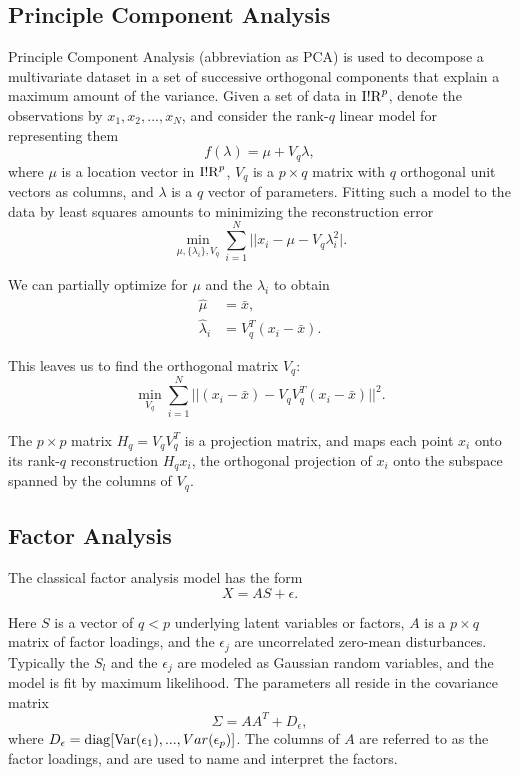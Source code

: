 \documentclass[10pt,journal,compsoc]{IEEEtran}
\begin{document}
\subsection{Principle Component Analysis}
\label{subsec:pca}

Principle Component Analysis (abbreviation as PCA) is used to decompose a multivariate dataset in a set of successive orthogonal components that explain a maximum amount of the variance. Given a set of data in ${\rm I!R}^p$, denote the observations by $x_1, x_2,...,x_N$, and consider the rank-$q$ linear model for representing them
\begin{equation}
  f(\lambda) = \mu + V_q\lambda,
\end{equation}
where $\mu$ is a location vector in ${\rm I!R}^p$, $V_q$ is a $p \times q$ matrix with $q$ orthogonal unit vectors as columns, and $\lambda$ is a $q$ vector of parameters. Fitting such a model to the data by least squares amounts to minimizing the reconstruction error
\begin{equation}
  \min_{\mu, \{\lambda_i\}, V_q} \sum_{i=1}^N||x_i - \mu - V_q\lambda_i^2|.
\end{equation}

We can partially optimize for $\mu$ and the $\lambda_i$ to obtain
\begin{align}
  \hat{\mu} &= \bar{x},\\
  \hat{\lambda}_i &= V_q^T(x_i - \bar{x}).
\end{align}

This leaves us to find the orthogonal matrix $V_q$:
\begin{equation}
  \min_{V_q}\sum_{i=1}^N||(x_i - \bar{x}) - V_qV_q^T(x_i - \bar{x})||^2.
\end{equation}

The $p\times p$ matrix $H_q = V_qV_q^T$ is a projection matrix, and maps each point $x_i$ onto its rank-$q$ reconstruction $H_qx_i$, the orthogonal projection of $x_i$ onto the subspace spanned by the columns of $V_q$.

\subsection{Factor Analysis}
\label{subsec:fa}
The classical factor analysis model has the form
\begin{equation}
  X = AS + \epsilon.
\end{equation}

Here $S$ is a vector of $q < p$ underlying latent variables or factors, $A$ is a $p \times q$ matrix of factor loadings, and the $\epsilon_j$ are uncorrelated zero-mean disturbances. Typically the $S_l$ and the $\epsilon_j$ are modeled as Gaussian random variables, and the model is fit by maximum likelihood. The parameters all reside in the covariance matrix
\begin{equation}
  \Sigma = AA^T + D_{\epsilon},
\end{equation}
where $D_{\epsilon} = {\rm diag}[{\rm Var}(\epsilon_1),...,Var(\epsilon_p)]$. The columns of $A$ are referred to as the  factor loadings, and are used to name and interpret the factors.
\end{document}
